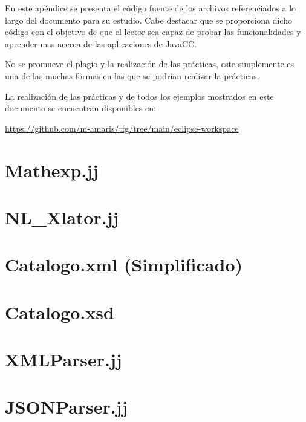 
En este apéndice se presenta el código fuente de los archivos referenciados a lo largo del documento para su estudio. Cabe destacar que se proporciona dicho código con el objetivo de que el lector sea capaz de probar las funcionalidades y aprender mas acerca de las aplicaciones de JavaCC.

No se promueve el plagio y la realización de las prácticas, este simplemente es una de las muchas formas en las que se podrían realizar la prácticas.

La realización de las prácticas y de todos los ejemplos mostrados en este documento se encuentran disponibles en:

\href{https://github.com/m-amaris/tfg/tree/main/eclipse-workspace}{https://github.com/m-amaris/tfg/tree/main/eclipse-workspace}

\section{Mathexp.jj}
\label{sec:mathexp}
\lstset{inputencoding=utf8/latin1}



\newpage
\section{NL\_Xlator.jj}
\label{sec:nlxlator}
\lstset{inputencoding=utf8/latin1}


\newpage
\section{Catalogo.xml (Simplificado)}
\label{sec:catalogoxml}
\lstset{inputencoding=utf8/latin1}


\newpage
\section{Catalogo.xsd }
\label{sec:catalogoxsd}
\lstset{inputencoding=utf8/latin1}


\newpage
\section{XMLParser.jj}
\label{sec:XMLParser}
\lstset{inputencoding=utf8/latin1}


\newpage
\section{JSONParser.jj}
\label{sec:JSONParser}
\lstset{inputencoding=utf8/latin1}




\restoregeometry